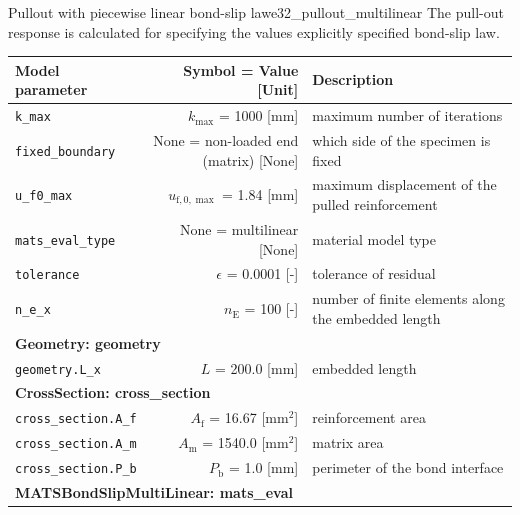 \documentclass[main.tex]{subfiles}
\begin{document}
\begin{bmcsex}{Pullout with piecewise linear bond-slip law}{e32_pullout_multilinear}
\noindent The pull-out response is calculated for specifying the values 
    explicitly specified bond-slip law.
 \\
\begin{center}
            
{\scriptsize 
\begin{longtable}{lrp{4cm}}\toprule
\textbf{\textsf{Model parameter}} 
& 
\textbf{\textsf{Symbol = Value [Unit]}} 
&
\textbf{\textsf{Description}}  \\\midrule \midrule
\texttt{k\_max} & $k_{\max}$ = 1000 [$\mathrm{mm}$] & {\footnotesize maximum number of iterations}  \\
            \texttt{fixed\_boundary} & None = non-loaded end (matrix) [None] & {\footnotesize which side of the specimen is fixed}  \\
            \texttt{u\_f0\_max} & $u_{\mathrm{f},0,{\max}}$ = 1.84 [mm] & {\footnotesize maximum displacement of the pulled reinforcement}  \\
            \texttt{mats\_eval\_type} & None = multilinear [None] & {\footnotesize material model type}  \\
            \texttt{tolerance} & $\epsilon$ = 0.0001 [-] & {\footnotesize tolerance of residual}  \\
            \texttt{n\_e\_x} & $n_\mathrm{E}$ = 100 [-] & {\footnotesize number of finite elements along the embedded length}  \\
            \midrule
\multicolumn{3}{l}{\textbf{\textsf{Geometry: geometry}}}\\

\texttt{geometry.L\_x} & $L$ = 200.0 [$\mathrm{mm}$] & {\footnotesize embedded length}  \\
            \midrule
\multicolumn{3}{l}{\textbf{\textsf{CrossSection: cross\_section}}}\\

\texttt{cross\_section.A\_f} & $A_\mathrm{f}$ = 16.67 [$\mathrm{mm}^2$] & {\footnotesize reinforcement area}  \\
            \texttt{cross\_section.A\_m} & $A_\mathrm{m}$ = 1540.0 [$\mathrm{mm}^2$] & {\footnotesize matrix area}  \\
            \texttt{cross\_section.P\_b} & $P_\mathrm{b}$ = 1.0 [$\mathrm{mm}$] & {\footnotesize perimeter of the bond interface}  \\
            \midrule
\multicolumn{3}{l}{\textbf{\textsf{MATSBondSlipMultiLinear: mats\_eval}}}\\


\end{longtable}}
\end{center}
\end{bmcsex}
\end{document}
